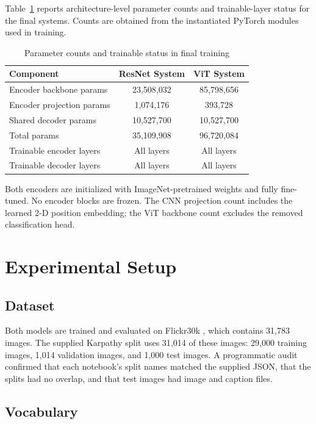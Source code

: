 \documentclass[conference]{IEEEtran}
\begin{document}
Table~\ref{tab:param_status} reports architecture-level parameter counts and trainable-layer status for the final systems. Counts are obtained from the instantiated PyTorch modules used in training.

\begin{table}[htbp]
\caption{Parameter counts and trainable status in final training}
\label{tab:param_status}
\centering
\begin{tabular}{lcc}
\toprule
\textbf{Component} & \textbf{ResNet System} & \textbf{ViT System} \\
\midrule
Encoder backbone params & 23,508,032 & 85,798,656 \\
Encoder projection params & 1,074,176 & 393,728 \\
Shared decoder params & 10,527,700 & 10,527,700 \\
Total params & 35,109,908 & 96,720,084 \\
Trainable encoder layers & All layers & All layers \\
Trainable decoder layers & All layers & All layers \\
\bottomrule
\end{tabular}
\end{table}

Both encoders are initialized with ImageNet-pretrained weights and fully fine-tuned. No encoder blocks are frozen. The CNN projection count includes the learned 2-D position embedding; the ViT backbone count excludes the removed classification head.

\section{Experimental Setup}

\subsection{Dataset}

Both models are trained and evaluated on Flickr30k \cite{young2014}, which contains 31{,}783 images. The supplied Karpathy split uses 31{,}014 of these images: 29{,}000 training images, 1{,}014 validation images, and 1{,}000 test images. A programmatic audit confirmed that each notebook's split names matched the supplied JSON, that the splits had no overlap, and that test images had image and caption files.

\subsection{Vocabulary}
\end{document}
